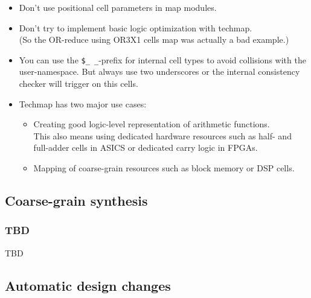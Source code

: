 \begin{frame}{\subsubsecname}
\begin{itemize}
\item Don't use positional cell parameters in map modules.
\medskip
\item Don't try to implement basic logic optimization with techmap. \\
{\small (So the OR-reduce using OR3X1 cells map was actually a bad example.)}
\medskip
\item You can use the {\tt \$\_\,\_}-prefix for internal cell types to avoid
collisions with the user-namespace. But always use two underscores or the
internal consistency checker will trigger on this cells.
\medskip
\item Techmap has two major use cases:
\begin{itemize}
\item Creating good logic-level representation of arithmetic functions. \\
This also means using dedicated hardware resources such as half- and full-adder
cells in ASICS or dedicated carry logic in FPGAs.
\smallskip
\item Mapping of coarse-grain resources such as block memory or DSP cells.
\end{itemize}
\end{itemize}
\end{frame}


\subsection{Coarse-grain synthesis}

\begin{frame}
\subsectionpage
\subsectionpagesuffix
\end{frame}

\subsubsection{TBD}

\begin{frame}{\subsubsecname}
TBD
\end{frame}


\subsection{Automatic design changes}

